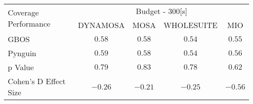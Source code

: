 \begin{tabular}{lcccc}\toprule 
\multirow{2}{*}{Coverage Performance} & \multicolumn{4}{c}{Budget - 300[s] } \\ \cmidrule(lr){2-5}  
                                      & DYNAMOSA&MOSA&WHOLESUITE&MIO                         \\ \midrule 
GBOS                                  & \(0.58\)&\(0.58\)&\(0.54\)&\(0.55\)                       \\ 
Pynguin                               & \(0.59\)&\(0.58\)&\(0.54\)&\(0.56\)                       \\ 
p Value                               & \(0.79\)&\(0.83\)&\(0.78\)&\(0.62\)                     \\ 
Cohen's D Effect Size                 & \(-0.26\)&\(-0.21\)&\(-0.25\)&\(-0.56\)                       \\ 
\bottomrule 
\end{tabular}